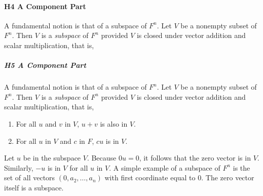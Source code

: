 \paragraph{H4 A Component Part }
A fundamental notion \cite{yao2002can} is that of a subspace of $F^n$. Let $V$ be a nonempty subset of 
$F^n$. Then $V$ is a {\it subspace} of $F^n$ provided $V$ is closed 
under vector addition and scalar multiplication, that is, 

\subparagraph{H5 A Component Part }
A fundamental notion \cite{yao2002can} is that of a subspace of $F^n$. Let $V$ be a nonempty subset of 
$F^n$. Then $V$ is a {\it subspace} of $F^n$ provided $V$ is closed 
under vector addition and scalar multiplication, that is, 
\begin{enumerate}
\item For all $u$ and $v$ in $V$, $u+v$ is 
also in $V$. 
\item For all $u$ in $V$ and $c$ in $F$, $cu$ is 
in $V$. 
\end{enumerate} 
Let $u$ be in the subspace $V$. Because $0u=0$, 
it follows that the zero vector is in $V$. Similarly, $-u$ is in $V$ 
for all $u$ in $V$. A simple example of a subspace of $F^n$ is the set 
of all vectors $(0,a_2,\ldots,a_n)$ with first coordinate equal to 0. 
The zero vector itself is a subspace.



